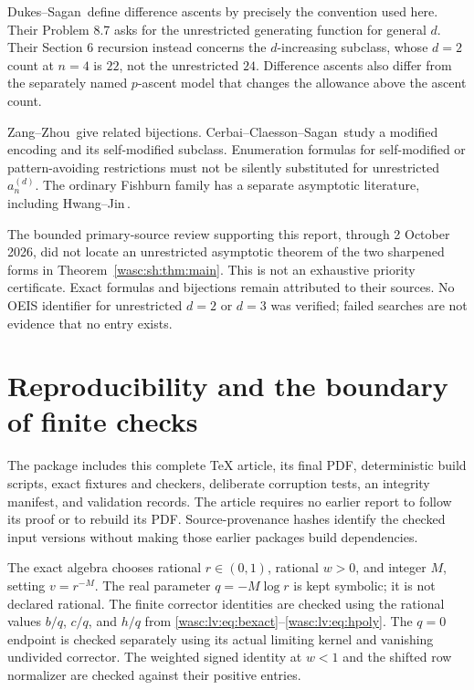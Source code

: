 \documentclass[11pt,a4paper]{article}
\theoremstyle{remark}\newtheorem{remark}[theorem]{Remark}
\numberwithin{equation}{section}
\begin{document}
Dukes--Sagan\,\cite{dukes} define difference ascents by precisely the convention used here. Their Problem 8.7 asks for the unrestricted generating function for general $d$. Their Section 6 recursion instead concerns the $d$-increasing subclass, whose $d=2$ count at $n=4$ is $22$, not the unrestricted $24$. Difference ascents also differ from the separately named $p$-ascent model that changes the allowance above the ascent count.

Zang--Zhou\,\cite{zang} give related bijections. Cerbai--Claesson--Sagan\,\cite{modified,selfmodified} study a modified encoding and its self-modified subclass. Enumeration formulas for self-modified or pattern-avoiding restrictions must not be silently substituted for unrestricted $a_n^{(d)}$. The ordinary Fishburn family has a separate asymptotic literature, including Hwang--Jin\,\cite{hwang}.

The bounded primary-source review supporting this report, through 2 October 2026, did not locate an unrestricted asymptotic theorem of the two sharpened forms in Theorem~\ref{wasc:sh:thm:main}. This is not an exhaustive priority certificate. Exact formulas and bijections remain attributed to their sources. No OEIS identifier for unrestricted $d=2$ or $d=3$ was verified; failed searches are not evidence that no entry exists.

\section{Reproducibility and the boundary of finite checks}\label{wasc:sh:sec:checks}
The package includes this complete TeX article, its final PDF, deterministic build scripts, exact fixtures and checkers, deliberate corruption tests, an integrity manifest, and validation records. The article requires no earlier report to follow its proof or to rebuild its PDF. Source-provenance hashes identify the checked input versions without making those earlier packages build dependencies.

The exact algebra chooses rational $r\in(0,1)$, rational $w>0$, and integer $M$, setting $v=r^{-M}$. The real parameter $q=-M\log r$ is kept symbolic; it is not declared rational. The finite corrector identities are checked using the rational values $b/q$, $c/q$, and $h/q$ from \eqref{wasc:lv:eq:bexact}--\eqref{wasc:lv:eq:hpoly}. The $q=0$ endpoint is checked separately using its actual limiting kernel and vanishing undivided corrector. The weighted signed identity at $w<1$ and the shifted row normalizer are checked against their positive entries.
\end{document}
